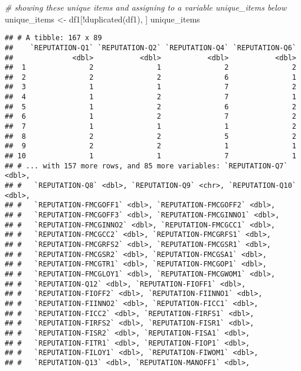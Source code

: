 \documentclass[
]{article}
\newenvironment{Shaded}{\begin{snugshade}}{\end{snugshade}}
\newcommand{\CommentTok}[1]{\textcolor[rgb]{0.56,0.35,0.01}{\textit{#1}}}
\newcommand{\FunctionTok}[1]{\textcolor[rgb]{0.00,0.00,0.00}{#1}}
\newcommand{\NormalTok}[1]{#1}
\newcommand{\OtherTok}[1]{\textcolor[rgb]{0.56,0.35,0.01}{#1}}
\newcommand{\SpecialCharTok}[1]{\textcolor[rgb]{0.00,0.00,0.00}{#1}}
\begin{document}
\begin{Shaded}
\begin{Highlighting}[]
\CommentTok{\# showing these unique items and assigning to a variable unique\_items below}
\NormalTok{unique\_items }\OtherTok{\textless{}{-}}\NormalTok{ df1[}\SpecialCharTok{!}\FunctionTok{duplicated}\NormalTok{(df1), ]}
\NormalTok{unique\_items}
\end{Highlighting}
\end{Shaded}

\begin{verbatim}
## # A tibble: 167 x 89
##    `REPUTATION-Q1` `REPUTATION-Q2` `REPUTATION-Q4` `REPUTATION-Q6`
##              <dbl>           <dbl>           <dbl>           <dbl>
##  1               2               1               2               2
##  2               2               2               6               1
##  3               1               1               7               2
##  4               1               2               7               1
##  5               1               2               6               2
##  6               1               2               7               2
##  7               1               1               1               2
##  8               2               2               5               2
##  9               2               2               1               1
## 10               1               1               7               1
## # ... with 157 more rows, and 85 more variables: `REPUTATION-Q7` <dbl>,
## #   `REPUTATION-Q8` <dbl>, `REPUTATION-Q9` <chr>, `REPUTATION-Q10` <dbl>,
## #   `REPUTATION-FMCGOFF1` <dbl>, `REPUTATION-FMCGOFF2` <dbl>,
## #   `REPUTATION-FMCGOFF3` <dbl>, `REPUTATION-FMCGINNO1` <dbl>,
## #   `REPUTATION-FMCGINNO2` <dbl>, `REPUTATION-FMCGCC1` <dbl>,
## #   `REPUTATION-FMCGCC2` <dbl>, `REPUTATION-FMCGRFS1` <dbl>,
## #   `REPUTATION-FMCGRFS2` <dbl>, `REPUTATION-FMCGSR1` <dbl>,
## #   `REPUTATION-FMCGSR2` <dbl>, `REPUTATION-FMCGSA1` <dbl>,
## #   `REPUTATION-FMCGTR1` <dbl>, `REPUTATION-FMCGOP1` <dbl>,
## #   `REPUTATION-FMCGLOY1` <dbl>, `REPUTATION-FMCGWOM1` <dbl>,
## #   `REPUTATION-Q12` <dbl>, `REPUTATION-FIOFF1` <dbl>,
## #   `REPUTATION-FIOFF2` <dbl>, `REPUTATION-FIINNO1` <dbl>,
## #   `REPUTATION-FIINNO2` <dbl>, `REPUTATION-FICC1` <dbl>,
## #   `REPUTATION-FICC2` <dbl>, `REPUTATION-FIRFS1` <dbl>,
## #   `REPUTATION-FIRFS2` <dbl>, `REPUTATION-FISR1` <dbl>,
## #   `REPUTATION-FISR2` <dbl>, `REPUTATION-FISA1` <dbl>,
## #   `REPUTATION-FITR1` <dbl>, `REPUTATION-FIOP1` <dbl>,
## #   `REPUTATION-FILOY1` <dbl>, `REPUTATION-FIWOM1` <dbl>,
## #   `REPUTATION-Q13` <dbl>, `REPUTATION-MANOFF1` <dbl>,

\end{verbatim}
\end{document}
